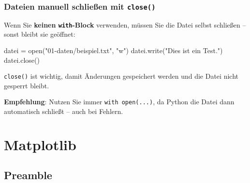 \documentclass[
  letterpaper,
  DIV=11,
  numbers=noendperiod]{scrreprt}
\newenvironment{Shaded}{\begin{snugshade}}{\end{snugshade}}
\newcommand{\BuiltInTok}[1]{\textcolor[rgb]{0.00,0.23,0.31}{#1}}
\newcommand{\NormalTok}[1]{\textcolor[rgb]{0.00,0.23,0.31}{#1}}
\newcommand{\OperatorTok}[1]{\textcolor[rgb]{0.37,0.37,0.37}{#1}}
\newcommand{\StringTok}[1]{\textcolor[rgb]{0.13,0.47,0.30}{#1}}
\begin{document}
\section{\texorpdfstring{Dateien manuell schließen mit
\texttt{close()}}{Dateien manuell schließen mit close()}}\label{dateien-manuell-schlieuxdfen-mit-close}

Wenn Sie \textbf{keinen \texttt{with}-Block} verwenden, müssen Sie die
Datei selbst schließen -- sonst bleibt sie geöffnet:

\begin{Shaded}
\begin{Highlighting}[]
\NormalTok{datei }\OperatorTok{=} \BuiltInTok{open}\NormalTok{(}\StringTok{"01{-}daten/beispiel.txt"}\NormalTok{, }\StringTok{"w"}\NormalTok{)}
\NormalTok{datei.write(}\StringTok{"Dies ist ein Test."}\NormalTok{)}
\NormalTok{datei.close()}
\end{Highlighting}
\end{Shaded}

\begin{tcolorbox}[enhanced jigsaw, colframe=quarto-callout-important-color-frame, coltitle=black, toprule=.15mm, arc=.35mm, title=\textcolor{quarto-callout-important-color}{\faExclamation}\hspace{0.5em}{Important}, toptitle=1mm, bottomrule=.15mm, leftrule=.75mm, rightrule=.15mm, breakable, bottomtitle=1mm, colbacktitle=quarto-callout-important-color!10!white, opacitybacktitle=0.6, left=2mm, titlerule=0mm, colback=white, opacityback=0]

\texttt{close()} ist wichtig, damit Änderungen gespeichert werden und
die Datei nicht gesperrt bleibt.

\textbf{Empfehlung}: Nutzen Sie immer \texttt{with\ open(...)}, da
Python die Datei dann automatisch schließt -- auch bei Fehlern.

\end{tcolorbox}

\part{Matplotlib}

\chapter*{Preamble}\label{preamble}

\end{document}
